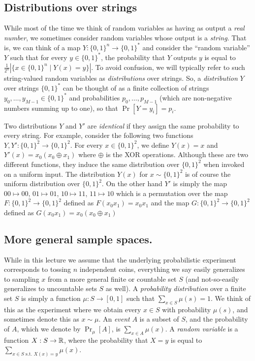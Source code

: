 \subsection{Distributions over strings}\label{Distributions-over-string}

While most of the time we think of random variables as having as output
a \emph{real number}, we sometimes consider random variables whose
output is a \emph{string}. That is, we can think of a map
\(Y:\{0,1\}^n \rightarrow \{0,1\}^*\) and consider the ``random
variable'' \(Y\) such that for every \(y\in \{0,1\}^*\), the probability
that \(Y\) outputs \(y\) is equal to
\(\tfrac{1}{2^n}\left| \{ x \in \{0,1\}^n \;|\; Y(x)=y \}\right|\). To
avoid confusion, we will typically refer to such string-valued random
variables as \emph{distributions} over strings. So, a
\emph{distribution} \(Y\) over strings \(\{0,1\}^*\) can be thought of
as a finite collection of strings \(y_0,\ldots,y_{M-1} \in \{0,1\}^*\)
and probabilities \(p_0,\ldots,p_{M-1}\) (which are non-negative numbers
summing up to one), so that \(\Pr[ Y = y_i ] = p_i\).

Two distributions \(Y\) and \(Y'\) are \emph{identical} if they assign
the same probability to every string. For example, consider the
following two functions \(Y,Y':\{0,1\}^2 \rightarrow \{0,1\}^2\). For
every \(x \in \{0,1\}^2\), we define \(Y(x)=x\) and
\(Y'(x)=x_0(x_0\oplus x_1)\) where \(\oplus\) is the XOR operations.
Although these are two different functions, they induce the same
distribution over \(\{0,1\}^2\) when invoked on a uniform input. The
distribution \(Y(x)\) for \(x\sim \{0,1\}^2\) is of course the uniform
distribution over \(\{0,1\}^2\). On the other hand \(Y'\) is simply the
map \(00 \mapsto 00\), \(01 \mapsto 01\), \(10 \mapsto 11\),
\(11 \mapsto 10\) which is a permutation over the map
\(F:\{0,1\}^2 \rightarrow \{0,1\}^2\) defined as \(F(x_0x_1)=x_0x_1\)
and the map \(G:\{0,1\}^2 \rightarrow \{0,1\}^2\) defined as
\(G(x_0x_1)=x_0(x_0 \oplus x_1)\)

\subsection{More general sample
spaces.}\label{More-general-sample-space}

While in this lecture we assume that the underlying probabilistic
experiment corresponds to tossing \(n\) independent coins, everything we
say easily generalizes to sampling \(x\) from a more general finite or
countable set \(S\) (and not-so-easily generalizes to uncountable sets
\(S\) as well). A \emph{probability distribution} over a finite set
\(S\) is simply a function \(\mu : S \rightarrow [0,1]\) such that
\(\sum_{x\in S}\mu(s)=1\). We think of this as the experiment where we
obtain every \(x\in S\) with probability \(\mu(s)\), and sometimes
denote this as \(x\sim \mu\). An \emph{event} \(A\) is a subset of
\(S\), and the probability of \(A\), which we denote by \(\Pr_\mu[A]\),
is \(\sum_{x\in A} \mu(x)\). A \emph{random variable} is a function
\(X:S \rightarrow {\mathbb{R}}\), where the probability that \(X=y\) is equal to
\(\sum_{x\in S \text{ s.t. } X(x)=y} \mu(x)\).

